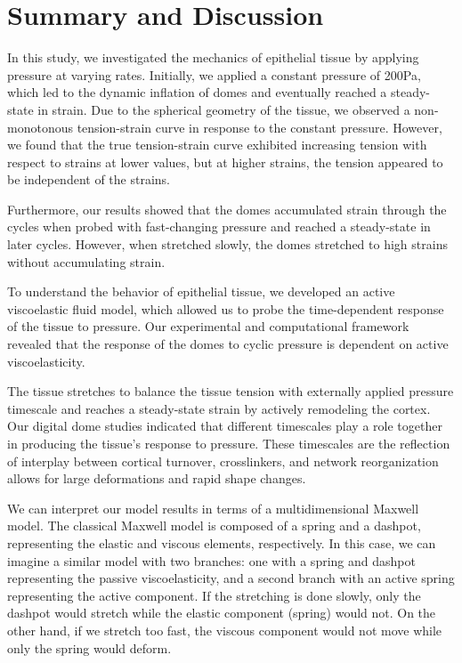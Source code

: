 \hypertarget{summary}{%
	\section{Summary and Discussion}\label{summary}}

In this study, we investigated the mechanics of epithelial tissue by
applying pressure at varying rates. Initially, we applied a constant
pressure of 200Pa, which led to the dynamic inflation of domes and
eventually reached a steady-state in strain. Due to the spherical
geometry of the tissue, we observed a non-monotonous tension-strain
curve in response to the constant pressure. However, we found that the
true tension-strain curve exhibited increasing tension with respect to
strains at lower values, but at higher strains, the tension appeared to
be independent of the strains.

Furthermore, our results showed that the domes accumulated strain
through the cycles when probed with fast-changing pressure and reached a
steady-state in later cycles. However, when stretched slowly, the domes
stretched to high strains without accumulating strain.

To understand the behavior of epithelial tissue, we developed an active
viscoelastic fluid model, which allowed us to probe the time-dependent
response of the tissue to pressure. Our experimental and computational
framework revealed that the response of the domes to cyclic pressure is
dependent on active viscoelasticity.

The tissue stretches to balance the tissue tension with externally
applied pressure timescale and reaches a steady-state strain by actively
remodeling the cortex. Our digital dome studies indicated that different
timescales play a role together in producing the tissue's response to
pressure. These timescales are the reflection of interplay between
cortical turnover, crosslinkers, and network reorganization allows for
large deformations and rapid shape changes.

We can interpret our model results in terms of a multidimensional
Maxwell model. The classical Maxwell model is composed of a spring and a
dashpot, representing the elastic and viscous elements, respectively. In
this case, we can imagine a similar model with two branches: one with a
spring and dashpot representing the passive viscoelasticity, and a
second branch with an active spring representing the active component.
If the stretching is done slowly, only the dashpot would stretch while
the elastic component (spring) would not. On the other hand, if we
stretch too fast, the viscous component would not move while only the
spring would deform.

